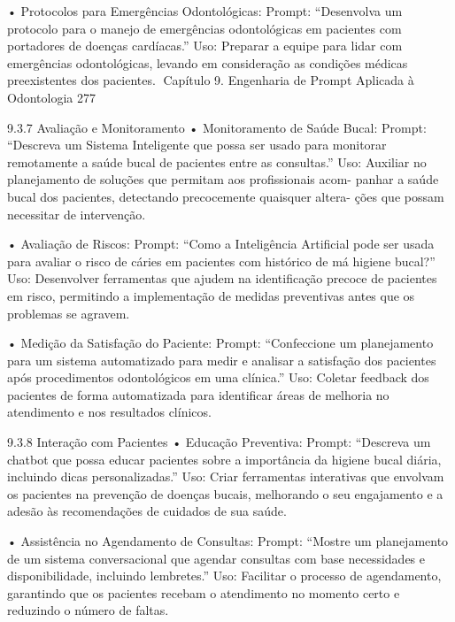     • Protocolos para Emergências Odontológicas:
      Prompt: “Desenvolva um protocolo para o manejo de emergências odontológicas
      em pacientes com portadores de doenças cardíacas.”
      Uso: Preparar a equipe para lidar com emergências odontológicas, levando em
      consideração as condições médicas preexistentes dos pacientes.
Capítulo 9. Engenharia de Prompt Aplicada à Odontologia                           277


9.3.7    Avaliação e Monitoramento
    • Monitoramento de Saúde Bucal:
      Prompt: “Descreva um Sistema Inteligente que possa ser usado para monitorar
      remotamente a saúde bucal de pacientes entre as consultas.”
      Uso: Auxiliar no planejamento de soluções que permitam aos profissionais acom-
      panhar a saúde bucal dos pacientes, detectando precocemente quaisquer altera-
      ções que possam necessitar de intervenção.

    • Avaliação de Riscos:
      Prompt: “Como a Inteligência Artificial pode ser usada para avaliar o risco de
      cáries em pacientes com histórico de má higiene bucal?”
      Uso: Desenvolver ferramentas que ajudem na identificação precoce de pacientes
      em risco, permitindo a implementação de medidas preventivas antes que os
      problemas se agravem.

    • Medição da Satisfação do Paciente:
      Prompt: “Confeccione um planejamento para um sistema automatizado para
      medir e analisar a satisfação dos pacientes após procedimentos odontológicos
      em uma clínica.”
      Uso: Coletar feedback dos pacientes de forma automatizada para identificar áreas
      de melhoria no atendimento e nos resultados clínicos.

9.3.8    Interação com Pacientes
    • Educação Preventiva:
      Prompt: “Descreva um chatbot que possa educar pacientes sobre a importância
      da higiene bucal diária, incluindo dicas personalizadas.”
      Uso: Criar ferramentas interativas que envolvam os pacientes na prevenção de
      doenças bucais, melhorando o seu engajamento e a adesão às recomendações
      de cuidados de sua saúde.

    • Assistência no Agendamento de Consultas:
      Prompt: “Mostre um planejamento de um sistema conversacional que agendar
      consultas com base necessidades e disponibilidade, incluindo lembretes.”
      Uso: Facilitar o processo de agendamento, garantindo que os pacientes recebam
      o atendimento no momento certo e reduzindo o número de faltas.

